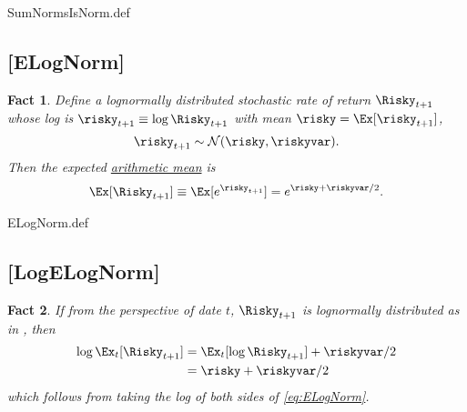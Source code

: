 \message{ !name(MathFactsList.tex)}\documentclass{handout}
\newtheorem{Fact}{Fact}
\begin{document}
\begin{verbatimwrite}{SumNormsIsNorm.def}
\providecommand{\SumNormsIsNorm}{\href{https://www.econ2.jhu.edu/people/ccarroll/public/LectureNotes/MathFacts/MathFactsList\#SumNormsIsNorm}{\ensuremath{\mathtt{[SumNormsIsNorm]}}}}
\end{verbatimwrite}

\hypertarget{ELogNorm}{}
\subsection{{[{ELogNorm}]}}

\begin{Fact} Define a lognormally distributed stochastic rate of return $\Risky_{t+1}$ whose log is $\risky_{t+1} \equiv \log \Risky_{t+1}$ with mean $\risky = \Ex[\risky_{t+1}]$,
  \begin{equation}
    \risky_{t+1} \sim \mathcal{N}(\risky,\riskyvar).
  \end{equation}
 Then the expected \href{https://en.wikipedia.org/wiki/Log-normal_distribution#Arithmetic_moments}{arithmetic mean} is 
\begin{equation}
        \Ex[\Risky_{t+1}]\equiv\Ex[e^{\risky_{t+1}}] = e^{\null{\risky}+\riskyvar/2} \label{eq:ELogNorm}.
      \end{equation}
\end{Fact}

\begin{verbatimwrite}{ELogNorm.def}
\providecommand{\ELogNorm}{\href{https://www.econ2.jhu.edu/people/ccarroll/public/LectureNotes/MathFacts/MathFactsList\#ELogNorm}{\ensuremath{\mathtt{[ELogNorm]}}}}
\end{verbatimwrite}

\hypertarget{LogELogNorm}{}
\subsection{[LogELogNorm]}

\begin{Fact} If from the perspective of date $t$, $\Risky_{t+1}$ is lognormally distributed as in {\ELogNorm}, then
\begin{equation}\begin{gathered}\begin{aligned}
        \log \Ex_{t}[\Risky_{t+1}] & =  \Ex_{t}[\log \Risky_{t+1}]+\riskyvar/2
\\ & =  \risky +\riskyvar/2
\end{aligned}\end{gathered}\end{equation}
which follows from taking the log of both sides of \eqref{eq:ELogNorm}.
\end{Fact}
\end{document}
